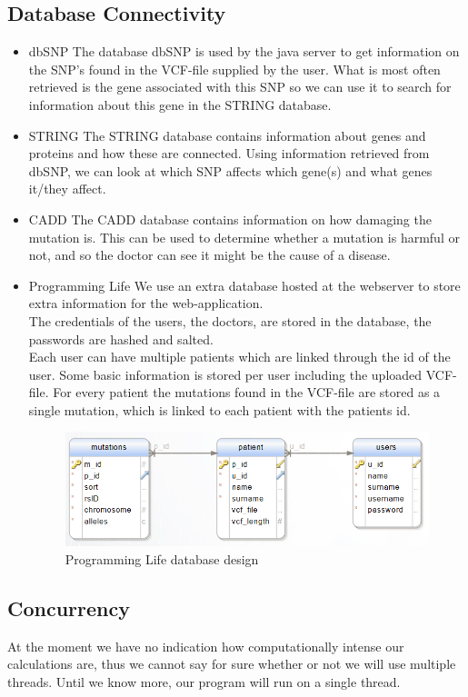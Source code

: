 	\subsection{Database Connectivity}
		\begin{itemize}
			\item dbSNP
				\subitem The database dbSNP is used by the java server to get information on the SNP's found in the VCF-file supplied by the user. What is most often retrieved is the gene associated with this SNP so we can use it to search for information about this gene in the STRING database.
			\item STRING
				\subitem The STRING database contains information about genes and proteins and how these are connected. Using information retrieved from dbSNP, we can look at which SNP affects which gene(s) and what genes it/they affect.
			\item CADD
				\subitem The CADD database contains information on how damaging the mutation is. This can be used to determine whether a mutation is harmful or not, and so the doctor can see it might be the cause of a disease.
			\item Programming Life
				\subitem We use an extra database hosted at the webserver to store extra information for the web-application. \\
				The credentials of the users, the doctors, are stored in the database, the passwords are hashed and salted.\\
				Each user can have multiple patients which are linked through the id of the user.
				Some basic information is stored per user including the uploaded VCF-file.
				For every patient the mutations found in the VCF-file are stored as a single mutation, which is linked to each patient with the patients id.\\
				\begin{figure}
					\centering
					\includegraphics[scale=0.55]{erd.png}
					\caption{Programming Life database design}
				\end{figure}
		\end{itemize}
	\subsection{Concurrency }
		At the moment we have no indication how computationally intense our calculations are, thus we cannot say for sure whether or not we will use multiple threads. Until we know more, our program will run on a single thread.
		
